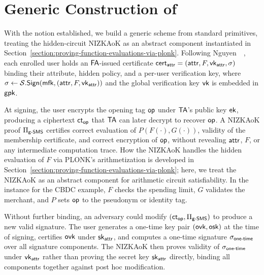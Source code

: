 \section{Generic Construction of \SMS}\label{section:generic-sms}

With the \SMS notion established, we build a generic scheme from standard primitives,
treating the hidden-circuit NIZKAoK as an abstract component
instantiated in Section~\ref{section:proving-function-evaluations-via-plonk}.
Following Nguyen~\etal~\cite{CRYPTO:NGSY22},
each enrolled user holds an $\mathsf{FA}$-issued certificate
$\mathsf{cert}_{\mathsf{attr}} = (\mathsf{attr}, F, \mathsf{vk}_\mathsf{attr}, \sigma)$
binding their attribute, hidden policy, and a per-user verification key,
where $\sigma \gets \mathcal{S}.\mathsf{Sign}(\mathsf{mfk}, (\mathsf{attr}, F, \mathsf{vk}_\mathsf{attr}))$
and the global verification key $\mathsf{vk}$ is embedded in $\mathsf{gpk}$.

At signing, the user encrypts the opening tag $\mathsf{op}$ under $\mathsf{TA}$'s public key $\mathsf{ek}$,
producing a ciphertext $\mathsf{ct}_\mathsf{op}$ that $\mathsf{TA}$ can later decrypt to recover $\mathsf{op}$.
A NIZKAoK proof $\Pi_{\mathsf{g}\textsf{-}\mathsf{SMS}}$ certifies correct evaluation of $P(F(\cdot), G(\cdot))$,
validity of the membership certificate,
and correct encryption of $\mathsf{op}$,
without revealing $\mathsf{attr}$, $F$, or any intermediate computation trace.
How the NIZKAoK handles the hidden evaluation of $F$
via PLONK's arithmetization is developed in Section~\ref{section:proving-function-evaluations-via-plonk};
here, we treat the NIZKAoK as an abstract component for arithmetic circuit satisfiability.
%
In the \SMS instance for the CBDC example,
$F$ checks the spending limit, $G$ validates the merchant,
and $P$ sets $\mathsf{op}$ to the pseudonym or identity tag.

Without further binding, an adversary could modify $(\mathsf{ct}_\mathsf{op}, \Pi_{\mathsf{g}\textsf{-}\mathsf{SMS}})$
to produce a new valid \SMS signature.
The user generates a one-time key pair $(\mathsf{ovk}, \mathsf{osk})$ at the time of signing,
certifies $\mathsf{ovk}$ under $\mathsf{sk}_\mathsf{attr}$,
and computes a one-time signature $\sigma_{\mathsf{one}\textsf{-}\mathsf{time}}$ over all signature components.
The NIZKAoK then proves validity of $\sigma_{\mathsf{one}\textsf{-}\mathsf{time}}$ under $\mathsf{vk}_\mathsf{attr}$
rather than proving the secret key $\mathsf{sk}_\mathsf{attr}$ directly,
binding all components together against post hoc modification.



